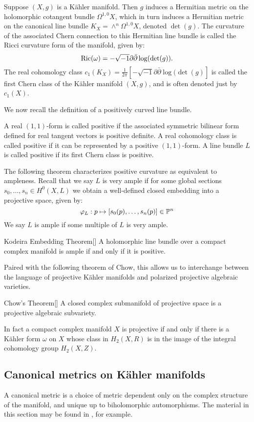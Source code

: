 \begin{example}
Suppose \((X,g)\) is a K\"ahler manifold. Then \(g\) induces a Hermitian metric on the holomorphic cotangent bundle \(\Omega^{1,0} X\), which in turn induces a Hermitian metric on the canonical line bundle \(K_X = \wedge^{n} \Omega^{1,0} X\), denoted \(\det(g)\). The curvature of the associated Chern connection to this Hermitian line bundle is called the Ricci curvature form of the manifold, given by:
\[
\mathop{\rm Ric}\nolimits(\omega) = - \sqrt{-1} \partial \bar{\partial} \log( \det(g) ).
\]
The real cohomology class \(c_1(K_X) = \frac{1}{2 \pi} [  - \sqrt{-1} \partial \bar{\partial} \log( \det(g) ]  \) is called the first Chern class of the K\"ahler manifold \((X,g)\), and is often denoted just by \(c_1(X)\).
\end{example}
We now recall the definition of a positively curved line bundle.
\begin{definition}
A real \((1,1)\)-form is called positive if the associated symmetric bilinear form defined for real tangent vectors is positive definite. A real cohomology class is called positive if it can be represented by a positive \((1,1)\)-form. A line bundle \(L\) is called positive if its first Chern class is positive.
\end{definition}
The following theorem characterizes positive curvature as equivalent to ampleness. Recall that we say \(L\) is very ample if for some global sections \(s_0,\dots,s_n \in H^0(X,L)\) we obtain a well-defined closed embedding into a projective space, given by:
\[
\varphi_L: p \mapsto [s_0(p),\dots,s_n(p)] \in \mathbb{P}^n
\]
We say \(L\) is ample if some multiple of \(L\) is very ample.
\begin{namedthm}{Kodeira Embedding Theorem}[\cite{}]
A holomorphic line bundle over a compact complex manifold is ample if and only if it is positive.
\end{namedthm}
Paired with the following theorem of Chow, this allows us to interchange between the language of projective K\"ahler manifolds and polarized projective algebraic varieties.
\begin{namedthm}{Chow's Theorem}[\cite{}]
A closed complex submanifold of projective space is a projective algebraic subvariety.
\end{namedthm}
In fact a compact complex manifold \(X\) is projective if and only if there is a K\"ahler form \(\omega\) on \(X\) whose class in \(H_2(X, R)\) is in the image of the integral cohomology group \(H_2(X, Z)\).
\subsection{Canonical metrics on K\"ahler manifolds}
A canonical metric is a choice of metric dependent only on the complex structure of the manifold, and unique up to biholomorphic automorphisms. The material in this section may be found in \cite{szebook}, for example.

